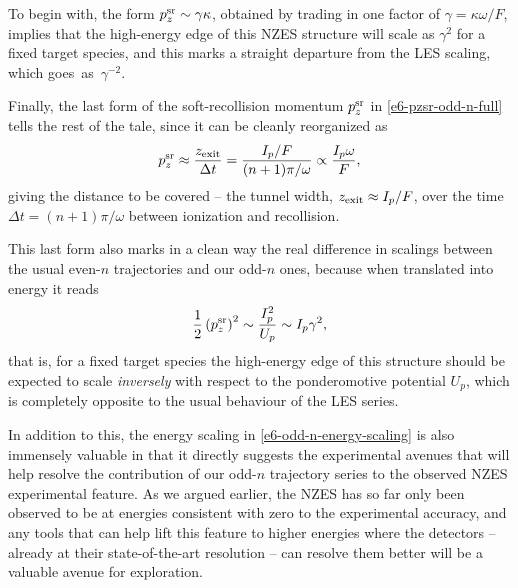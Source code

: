 \begin{itemize}
To begin with, the form $p_z^{\mathrm{sr}}\sim \gamma \kappa$, obtained by trading in one factor of $\gamma=\kappa\omega/F$, implies that the high-energy edge of this NZES structure will scale as $\gamma^2$ for a fixed target species, and this marks a straight departure from the LES scaling, which goes~as~$\gamma^{-2}$.

Finally, the last form of the soft-recollision momentum $p_z^{\mathrm{sr}}$ in \eqref{e6-pzsr-odd-n-full} tells the rest of the tale, since it can be cleanly reorganized as 
\begin{equation}
p_z^{\mathrm{sr}} 
\approx \frac{z_\mathrm{exit}}{\Delta t}
= \frac{I_p/F}{(n+1)\pi/\omega}
\propto \frac{I_p\omega}{F},
\label{e6-pzsr-odd-n-summary}
\end{equation}
giving the distance to be covered -- the tunnel width, $z_\mathrm{exit}\approx I_p/F$, over the time $\Delta t=(n+1)\pi/\omega$ between ionization and recollision.

\end{itemize}


This last form also marks in a clean way the real difference in scalings between the usual even-$n$ trajectories and our odd-$n$ ones, because when translated into energy it reads
\begin{equation}
\frac12\left(p_z^{\mathrm{sr}}\right)^2 
\sim \frac{I_p^2}{U_p}
\sim I_p\gamma^2,
\label{e6-odd-n-energy-scaling}
\end{equation}
that is, for a fixed target species the high-energy edge of this structure should be expected to scale \textit{inversely} with respect to the ponderomotive potential $U_p$, which is completely opposite to the usual behaviour of the LES series.

In addition to this, the energy scaling in \eqref{e6-odd-n-energy-scaling} is also immensely valuable in that it directly suggests the experimental avenues that will help resolve the contribution of our odd-$n$ trajectory series to the observed NZES experimental feature. As we argued earlier, the NZES has so far only been observed to be at energies consistent with zero to the experimental accuracy, and any tools that can help lift this feature to higher energies where the detectors -- already at their state-of-the-art resolution -- can resolve them better will be a valuable avenue for exploration. 





